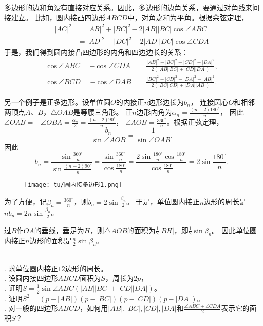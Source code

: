 \documentclass[12pt,UTF8]{ctexbook}
\begin{document}
多边形的边和角没有直接对应关系。因此，多边形的边角关系，要通过对角线来间接建立。
比如，圆内接凸四边形$ABCD$中，对角之和为平角。根据余弦定理，
\begin{align*}
    |AC|^2 &= |AB|^2 + |BC|^2 -2|AB||BC|\cos\angle ABC  \\
    &= |AD|^2 + |DC|^2 -2|AD||DC|\cos\angle CDA 
\end{align*}
于是，我们得到圆内接凸四边形的内角和四边边长的关系：
\begin{align*}
    \cos\angle ABC = -\cos \angle CDA &= \frac{|AB|^2 + |BC|^2 - |CD|^2 - |DA|^2 }{2(|AB||BC| + |CD||DA|)},  \\
    \cos\angle BCD = -\cos \angle DAB &= \frac{|BC|^2 + |CD|^2 - |DA|^2 - |AB|^2 }{2(|BC||CD| + |DA||AB|)}.  
\end{align*}

另一个例子是正多边形。设单位圆$O$的内接正$n$边形边长为$b_n$，
连接圆心$O$和相邻两顶点$A$、$B$，$\triangle OAB$是等腰三角形。
正$n$边形内角为$\alpha_n = \frac{(n-2)180^\circ}{n}$，
因此$\angle OAB = -\angle OBA = \frac{\alpha_n}{2} = \frac{(n-2)90^\circ}{n}$，
$\angle AOB = \frac{360^\circ}{n}$。根据正弦定理，
$$ \frac{b_n}{\sin \angle AOB} = \frac{1}{\sin \angle OAB}.$$
因此
$$b_n = \frac{\sin \frac{360^\circ}{n}}{\sin \frac{(n-2)90^\circ}{n}} = \frac{\sin \frac{360^\circ}{n}}{\cos \frac{180^\circ}{n}} = \frac{2\sin \frac{180^\circ}{n}\cos \frac{180^\circ}{n}}{\cos \frac{180^\circ}{n}} = 2\sin \frac{180^\circ}{n}.$$

\begin{figure}[h] %
    \vspace{4pt}
    \centering
    \texttt{[image: tu/圆内接多边形1.png]}
\end{figure}

为了方便，记$\beta_n = \frac{360^\circ}{n}$，则$b_n = 2\sin \frac{\beta_n}{2}$。
于是，单位圆内接正$n$边形的周长是$nb_n = 2n\sin \frac{\beta_n}{2}$。

过$B$作$OA$的垂线，垂足为$H$，则$\triangle AOB$的面积为$\frac12 |BH|$，即$\frac12 \sin{\beta_n}$。
因此单位圆内接正$n$边形的面积是$\frac{n}{2} \sin{\beta_n}$。

\begin{xt}\label{xt:2-6-10}
    \mbox{} \\
    . 求单位圆内接正$12$边形的周长。\\
    . 设圆内接四边形$ABCD$面积为$S$，周长为$2p$，\\
    . 证明$S = \frac12 \sin \angle ABC (|AB||BC| + |CD||DA|)$。 \\
    . 证明$S^2 = (p - |AB|)(p - |BC|)(p - |CD|)(p - |DA|)$。\\
    . 对一般的四边形$ABCD$，如何用$|AB|, |BC|, |CD|, |DA|$和$\frac{\angle ABC + \angle CDA}{2}$表示它的面积$S$？
\end{xt}
\end{document}

